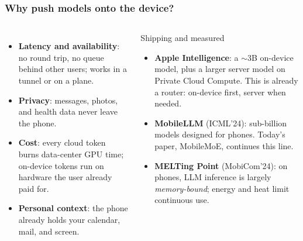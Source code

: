 \begin{frame}
\frametitle{Why push models onto the device?}
\begin{columns}[T]
\begin{itemize}\setlength{\itemsep}{5pt}
  \item \textbf{Latency and availability}: no round trip, no queue behind other users; works in a tunnel or on a plane.
  \item \textbf{Privacy}: messages, photos, and health data never leave the phone.
  \item \textbf{Cost}: every cloud token burns data-center GPU time; on-device tokens run on hardware the user already paid for.
  \item \textbf{Personal context}: the phone already holds your calendar, mail, and screen.
\end{itemize}
\begin{block}{Shipping and measured}
\small
\begin{itemize}\setlength{\itemsep}{3pt}
  \item \textbf{Apple Intelligence}: a $\sim$3B on-device model, plus a larger server model on Private Cloud Compute. This is already a router: on-device first, server when needed.
  \item \textbf{MobileLLM} (ICML'24): sub-billion models designed for phones. Today's paper, MobileMoE, continues this line.
  \item \textbf{MELTing Point} (MobiCom'24): on phones, LLM inference is largely \emph{memory-bound}; energy and heat limit continuous use.
\end{itemize}
\end{block}
\end{columns}
\end{frame}

